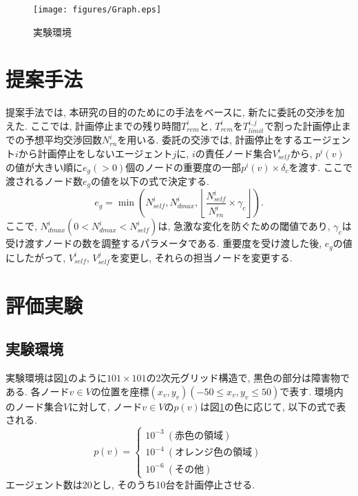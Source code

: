\documentclass[10pt,a4j,twocolumn]{jsarticle}
\begin{document}
\begin{figure}
\centering
\texttt{[image: figures/Graph.eps]}
\caption{実験環境}
\label{fig:実験環境}
\end{figure}

\section{提案手法}
提案手法では, 本研究の目的のために\cite{KAIS2019}の手法をベースに, 新たに委託の交渉を加えた. ここでは, 計画停止までの残り時間$T^i_{rem}$と, $T^i_{rem}$を$T^{i,j}_{limit}$で割った計画停止までの予想平均交渉回数$N^i_{rn}$を用いる. 委託の交渉では, 計画停止をするエージェント$i$から計画停止をしないエージェント$j$に, $i$の責任ノード集合$V^i_{self}$から, $p^i(v)$の値が大きい順に$e_g(>0)$個のノードの重要度の一部$p^i(v) \times \delta_c$を渡す. ここで渡されるノード数$e_g$の値を以下の式で決定する.
\[
e_g = \min\left(N^i_{self}, N^i_{dmax}, \left\lfloor \frac{N^i_{self}}{N^i_{rn}} \times \gamma_c \right\rfloor \right).
\]
ここで, $N^i_{dmax}(0 < N^i_{dmax} < N^i_{self})$は, 急激な変化を防ぐための閾値であり, $\gamma_c$は受け渡すノードの数を調整するパラメータである. 重要度を受け渡した後, $e_g$の値にしたがって, $V^{i}_{self}$, $V^{j}_{self}$を変更し, それらの担当ノードを変更する.

\section{評価実験}
\subsection{実験環境}
実験環境は図\ref{fig:実験環境}のように$101 \times 101$の2次元グリッド構造で, 黒色の部分は障害物である. 各ノード$v \in V$の位置を座標$(x_v, y_v)(-50 \leq x_v, y_v \leq 50)$で表す. 環境内のノード集合$V$に対して, ノード$v \in V$の$p(v)$は図\ref{fig:実験環境}の色に応じて, 以下の式で表される.
\[
p(v)= \left \{
\begin{array}{l}
10^{-3}\ (赤色の領域) \\
10^{-4}\ (オレンジ色の領域) \\
10^{-6}\ (その他)
\end{array}
\right.
\]
エージェント数は20とし, そのうち10台を計画停止させる.
\end{document}

